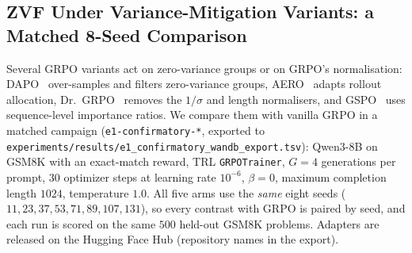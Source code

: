 
\subsection{ZVF Under Variance-Mitigation Variants: a Matched 8-Seed Comparison}
\label{sec:zvf-cross-library}
Several GRPO variants act on zero-variance groups or on GRPO's normalisation:
DAPO~\citep{yu2025dapo} over-samples and filters zero-variance groups,
AERO~\citep{zhang2026aero} adapts rollout allocation,
Dr.~GRPO~\citep{tong2025drgrpo} removes the $1/\sigma$ and length normalisers, and
GSPO~\citep{qwen2025gspo} uses sequence-level importance ratios. We compare them
with vanilla GRPO in a matched campaign (\texttt{e1-confirmatory-*}, exported to
\texttt{experiments/results/e1\_confirmatory\_wandb\_export.tsv}): Qwen3-8B on GSM8K
with an exact-match reward, TRL \texttt{GRPOTrainer}, $G{=}4$ generations per
prompt, $30$ optimizer steps at learning rate $10^{-6}$, $\beta{=}0$, maximum
completion length $1024$, temperature $1.0$. All five arms use the \emph{same}
eight seeds ($11, 23, 37, 53, 71, 89, 107, 131$), so every contrast with GRPO is
paired by seed, and each run is scored on the same $500$ held-out GSM8K problems.
Adapters are released on the Hugging Face Hub (repository names in the export).


